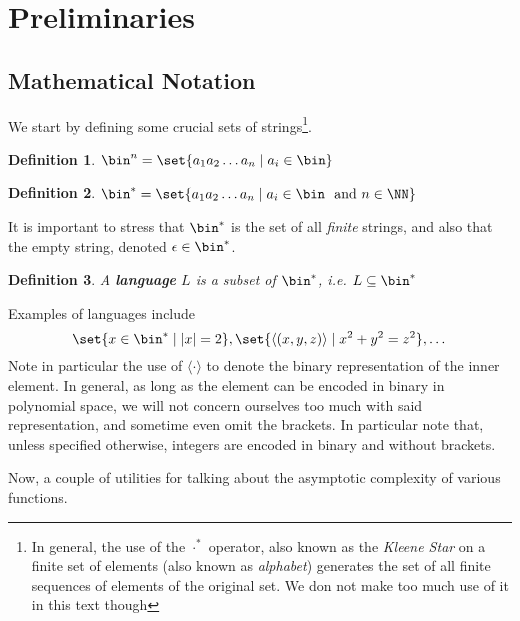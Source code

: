\documentclass{article}
\newtheorem{definition}{Definition}
\begin{document}
\section{Preliminaries}
\label{preliminaries}
\subsection{Mathematical Notation}
We start by defining some crucial sets of strings\footnote{In general, the use of the $\cdot ^ *$ operator, also known as the \textit{Kleene Star} on a finite set of elements (also known as \textit{alphabet}) generates the set of all finite sequences of elements of the original set. We don not make too much use of it in this text though}.
\begin{definition}
    $\bin^n = \set{ a_1 a_2 \dots a_n \mid a_i \in \bin}$
\end{definition}
\begin{definition}
    $\bin^* = \set{ a_1 a_2 \dots a_n \mid a_i \in \bin \text{ \normalfont{ and }} n \in \NN }$
\end{definition}

It is important to stress that $\bin^*$ is the set of all \textit{finite} strings, and also that the empty string, denoted $\epsilon \in \bin^*$.

\begin{definition}
    A \textbf{language} $L$ is a subset of $\bin^*$, i.e. $L \subseteq \bin^*$
\end{definition}

Examples of languages include
\[ \set{ x \in \bin^* \mid |x| = 2 }, \set{ \langle(x, y, z)\rangle \mid x^2 + y^2 = z^2 }, \dots \]
Note in particular the use of $\langle \cdot \rangle$ to denote the binary representation of the inner element. In general, as long as the element can be encoded in binary in polynomial space, we will not concern ourselves too much with said representation, and sometime even omit the brackets. In particular note that, unless specified otherwise, integers are encoded in binary and without brackets.  \par

Now, a couple of utilities for talking about the asymptotic complexity of various functions.
\end{document}
